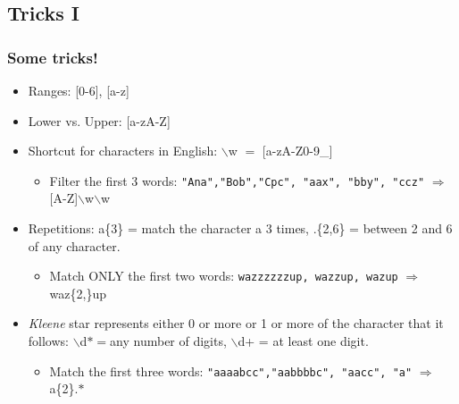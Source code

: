 \documentclass[xcolor=x11names,compress]{beamer}
\renewcommand{\(}{\begin{columns}}
\renewcommand{\)}{\end{columns}}
\newcommand{\<}[1]{\begin{column}{#1}}
\renewcommand{\>}{\end{column}}
\begin{document}
\subsection{Tricks I}
\begin{frame}[fragile]
\frametitle{Some tricks!}
	\begin{itemize}
		\item Ranges: [0-6], [a-z]
		\item Lower vs. Upper: [a-zA-Z]
		\item Shortcut for characters in English: $\backslash$w $=$ [a-zA-Z0-9\_]
		\begin{itemize}
			\item Filter the first 3 words: \texttt{"Ana","Bob","Cpc", "aax", "bby", "ccz"} \pause $\Rightarrow$ [A-Z]$\backslash$w$\backslash$w
		\end{itemize}
		\item Repetitions: a\{3\} = match the character a 3 times, .\{2,6\} = between 2 and 6 of any character. 
		\begin{itemize}
			\item Match ONLY the first two words: \texttt{wazzzzzzup, wazzup, wazup} $\Rightarrow$ waz\{2,\}up
		\end{itemize}
			\item \emph{Kleene} star represents either 0 or more or 1 or more of the character that it follows: $\backslash$d$*=$any number of digits, $\backslash$d+ = at least one digit.
			\begin{itemize}
				\item Match the first three words: \texttt{"aaaabcc","aabbbbc", "aacc", "a"} \pause $\Rightarrow$ a\{2\}.$*$
			\end{itemize}
	\end{itemize}
\end{frame}


\end{document}
